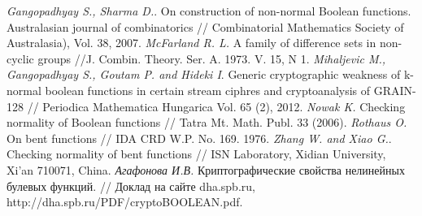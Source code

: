 \begin{thebibliography}{99}
 {\it Gangopadhyay S., Sharma D.}. On construction of non-normal Boolean functions. Australasian journal of combinatorics // Combinatorial Mathematics Society of Australasia), Vol. 38, 2007.
 {\it McFarland R. L.} A family of difference sets in non-cyclic groups //J. Combin. Theory. Ser. A. 1973. V. 15, N 1.
 {\it Mihaljevic M., Gangopadhyay S., Goutam P. and Hideki I}. Generic cryptographic weakness of k-normal boolean functions in certain stream ciphres and cryptoanalysis of GRAIN-128 // Periodica Mathematica Hungarica Vol. 65 (2), 2012.
 {\it Nowak K.} Checking normality of Boolean functions // Tatra Mt. Math. Publ. 33 (2006).
 {\it Rothaus O.} On bent functions // IDA CRD W.P. No. 169. 1976.
 {\it Zhang W. and Xiao G.}. Checking normality of bent functions // ISN Laboratory, Xidian University, Xi’an 710071, China.
 {\it Агафонова И.В.} Криптографические свойства нелинейных булевых функций. // Доклад на сайте dha.spb.ru, http://dha.spb.ru/PDF/cryptoBOOLEAN.pdf.









\end{thebibliography}
